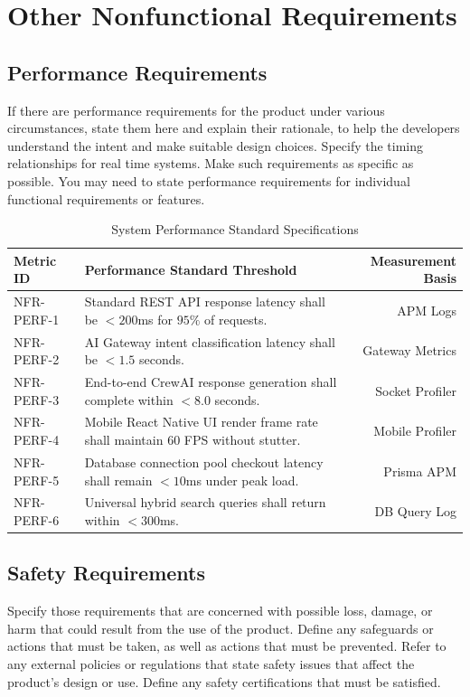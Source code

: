 \documentclass[11pt,a4paper]{article}
\begin{document}
\newpage
\section{Other Nonfunctional Requirements}

\subsection{Performance Requirements}
If there are performance requirements for the product under various circumstances, state them here and explain their rationale, to help the developers understand the intent and make suitable design choices. Specify the timing relationships for real time systems. Make such requirements as specific as possible. You may need to state performance requirements for individual functional requirements or features.

\begin{table}[h!]
\centering
\begin{tabularx}{\textwidth}{|l|X|r|}
\hline
\textbf{Metric ID} & \textbf{Performance Standard Threshold} & \textbf{Measurement Basis} \\ \hline
NFR-PERF-1 & Standard REST API response latency shall be $<200$ms for $95\%$ of requests. & APM Logs \\ \hline
NFR-PERF-2 & AI Gateway intent classification latency shall be $<1.5$ seconds. & Gateway Metrics \\ \hline
NFR-PERF-3 & End-to-end CrewAI response generation shall complete within $<8.0$ seconds. & Socket Profiler \\ \hline
NFR-PERF-4 & Mobile React Native UI render frame rate shall maintain 60 FPS without stutter. & Mobile Profiler \\ \hline
NFR-PERF-5 & Database connection pool checkout latency shall remain $<10$ms under peak load. & Prisma APM \\ \hline
NFR-PERF-6 & Universal hybrid search queries shall return within $<300$ms. & DB Query Log \\ \hline
\end{tabularx}
\caption{System Performance Standard Specifications}
\end{table}

\subsection{Safety Requirements}
Specify those requirements that are concerned with possible loss, damage, or harm that could result from the use of the product. Define any safeguards or actions that must be taken, as well as actions that must be prevented. Refer to any external policies or regulations that state safety issues that affect the product’s design or use. Define any safety certifications that must be satisfied.
\end{document}
